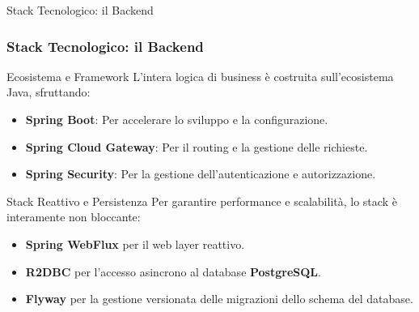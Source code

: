 \documentclass[8pt]{beamer}
\begin{document}
\begin{frame}{Stack Tecnologico: il Backend}
  \frametitle{Stack Tecnologico: il Backend}

  \begin{block}{Ecosistema e Framework}
    L'intera logica di business è costruita sull'ecosistema Java, sfruttando:
    \begin{itemize}
      \item \textbf{Spring Boot}: Per accelerare lo sviluppo e la configurazione.
      \item \textbf{Spring Cloud Gateway}: Per il routing e la gestione delle richieste.
      \item \textbf{Spring Security}: Per la gestione dell'autenticazione e autorizzazione.
    \end{itemize}
  \end{block}

  \begin{alertblock}{Stack Reattivo e Persistenza}
    Per garantire performance e scalabilità, lo stack è interamente non bloccante:
    \begin{itemize}
      \item \textbf{Spring WebFlux} per il web layer reattivo.
      \item \textbf{R2DBC} per l'accesso asincrono al database \textbf{PostgreSQL}.
      \item \textbf{Flyway} per la gestione versionata delle migrazioni dello schema del database.
    \end{itemize}
  \end{alertblock}
\end{frame}
\end{document}
